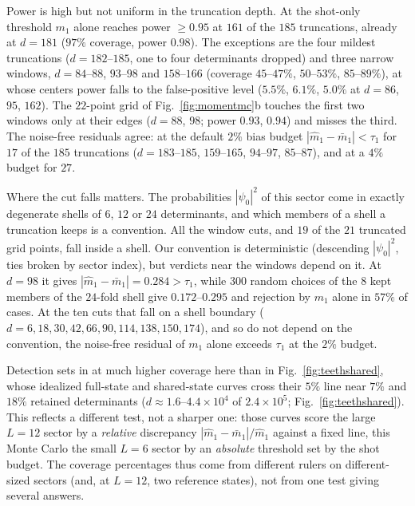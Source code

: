 \documentclass[submission, PhysCore]{SciPost}
\begin{document}
\begin{appendix}
Power is high but not uniform in the truncation depth. At the shot-only threshold $m_1$ alone reaches power $\ge0.95$ at $161$ of the $185$ truncations, already at $d=181$ ($97\%$ coverage, power $0.98$). The exceptions are the four mildest truncations ($d=182$--$185$, one to four determinants dropped) and three narrow windows, $d=84$--$88$, $93$--$98$ and $158$--$166$ (coverage $45$--$47\%$, $50$--$53\%$, $85$--$89\%$), at whose centers power falls to the false-positive level ($5.5\%$, $6.1\%$, $5.0\%$ at $d=86$, $95$, $162$). The $22$-point grid of Fig.~\ref{fig:momentmc}b touches the first two windows only at their edges ($d=88$, $98$; power $0.93$, $0.94$) and misses the third. The noise-free residuals agree: at the default $2\%$ bias budget $|\widehat m_1-\bar m_1|<\tau_1$ for $17$ of the $185$ truncations ($d=183$--$185$, $159$--$165$, $94$--$97$, $85$--$87$), and at a $4\%$ budget for $27$.

Where the cut falls matters. The probabilities $|\psi_0|^2$ of this sector come in exactly degenerate shells of $6$, $12$ or $24$ determinants, and which members of a shell a truncation keeps is a convention. All the window cuts, and $19$ of the $21$ truncated grid points, fall inside a shell. Our convention is deterministic (descending $|\psi_0|^2$, ties broken by sector index), but verdicts near the windows depend on it. At $d=98$ it gives $|\widehat m_1-\bar m_1|=0.284>\tau_1$, while $300$ random choices of the $8$ kept members of the $24$-fold shell give $0.172$--$0.295$ and rejection by $m_1$ alone in $57\%$ of cases. At the ten cuts that fall on a shell boundary ($d=6,18,30,42,66,90,114,138,150,174$), and so do not depend on the convention, the noise-free residual of $m_1$ alone exceeds $\tau_1$ at the $2\%$ budget.

Detection sets in at much higher coverage here than in Fig.~\ref{fig:teethshared}, whose idealized full-state and shared-state curves cross their $5\%$ line near $7\%$ and $18\%$ retained determinants ($d\approx1.6$--$4.4\times10^4$ of $2.4\times10^5$; Fig.~\ref{fig:teethshared}). This reflects a different test, not a sharper one: those curves score the large $L=12$ sector by a \emph{relative} discrepancy $|\widehat m_1-\bar m_1|/\widehat m_1$ against a fixed line, this Monte Carlo the small $L=6$ sector by an \emph{absolute} threshold set by the shot budget. The coverage percentages thus come from different rulers on different-sized sectors (and, at $L=12$, two reference states), not from one test giving several answers.


\end{appendix}
\end{document}

